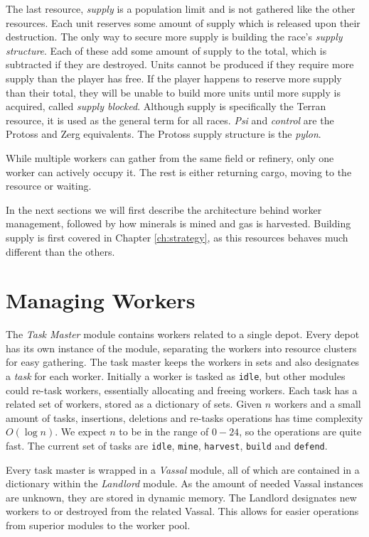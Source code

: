 The last resource, \emph{supply} is a population limit and is not gathered like the other resources. Each unit reserves some amount of supply which is released upon their destruction. The only way to secure more supply is building the race's \emph{supply structure}. Each of these add some amount of supply to the total, which is subtracted if they are destroyed. Units cannot be produced if they require more supply than the player has free. If the player happens to reserve more supply than their total, they will be unable to build more units until more supply is acquired, called \emph{supply blocked}. Although supply is specifically the Terran resource, it is used as the general term for all races. \emph{Psi} and \emph{control} are the Protoss and Zerg equivalents. The Protoss supply structure is the \emph{pylon}.

While multiple workers can gather from the same field or refinery, only one worker can actively occupy it. The rest is either returning cargo, moving to the resource or waiting.

In the next sections we will first describe the architecture behind worker management, followed by how minerals is mined and gas is harvested. Building supply is first covered in Chapter \ref{ch:strategy}, as this resources behaves much different than the others.

\section{Managing Workers}
The \emph{Task Master} module contains workers related to a single depot. Every depot has its own instance of the module, separating the workers into resource clusters for easy gathering. The task master keeps the workers in sets and also designates a \emph{task} for each worker. Initially a worker is tasked as \texttt{idle}, but other modules could re-task workers, essentially allocating and freeing workers. Each task has a related set of workers, stored as a dictionary of sets. Given $n$ workers and a small amount of tasks, insertions, deletions and re-tasks operations has time complexity $O(\log n)$. We expect $n$ to be in the range of $0-24$, so the operations are quite fast. The current set of tasks are \texttt{idle}, \texttt{mine}, \texttt{harvest}, \texttt{build} and \texttt{defend}.

Every task master is wrapped in a \emph{Vassal} module, all of which are contained in a dictionary within the \emph{Landlord} module. As the amount of needed Vassal instances are unknown, they are stored in dynamic memory. The Landlord designates new workers to or destroyed from the related Vassal. This allows for easier operations from superior modules to the worker pool.

